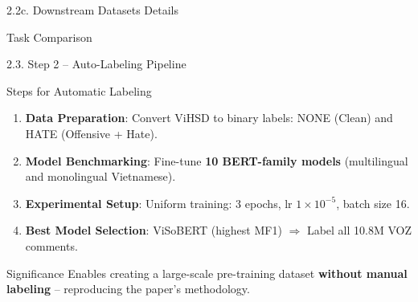 \documentclass[11pt, aspectratio=169]{beamer}
\begin{document}
\begin{frame}[fragile, shrink=10]{2.2c. Downstream Datasets Details}
\vspace{0.3cm}
\begin{block}{Task Comparison}
  \centering
\end{block}
\end{frame}

\begin{frame}[fragile, shrink=5]{2.3. Step 2 -- Auto-Labeling Pipeline}

\begin{block}{Steps for Automatic Labeling}
  \begin{enumerate}
    \item \textbf{Data Preparation}: Convert ViHSD to binary labels: NONE (Clean) and HATE (Offensive + Hate).
    \item \textbf{Model Benchmarking}: Fine-tune \textbf{10 BERT-family models} (multilingual and monolingual Vietnamese).
    \item \textbf{Experimental Setup}: Uniform training: 3 epochs, lr $1 \times 10^{-5}$, batch size 16.
    \item \textbf{Best Model Selection}: ViSoBERT (highest MF1) $\Rightarrow$ Label all 10.8M VOZ comments.
  \end{enumerate}
\end{block}

\vspace{0.2cm}
\begin{block}{Significance}
  Enables creating a large-scale pre-training dataset \textbf{without manual labeling} -- reproducing the paper's methodology.
\end{block}
\end{frame}
\end{document}
